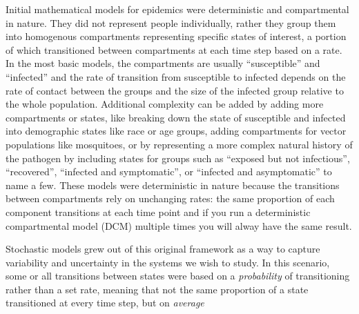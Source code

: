 \documentclass [11pt, proquest] {uwthesis}[2015/03/03]
\begin{document}
Initial mathematical models for epidemics were deterministic and
compartmental in nature. They did not represent people individually,
rather they group them into homogenous compartments representing
specific states of interest, a portion of which transitioned between
compartments at each time step based on a rate. In the most basic
models, the compartments are usually ``susceptible'' and ``infected''
and the rate of transition from susceptible to infected depends on the
rate of contact between the groups and the size of the infected group
relative to the whole population. Additional complexity can be added by
adding more compartments or states, like breaking down the state of
susceptible and infected into demographic states like race or age
groups, adding compartments for vector populations like mosquitoes, or
by representing a more complex natural history of the pathogen by
including states for groups such as ``exposed but not infectious'',
``recovered'', ``infected and symptomatic'', or ``infected and
asymptomatic'' to name a few. These models were deterministic in nature
because the transitions between compartments rely on unchanging rates:
the same proportion of each component transitions at each time point and
if you run a deterministic compartmental model (DCM) multiple times you
will alway have the same result.

Stochastic models grew out of this original framework as a way to
capture variability and uncertainty in the systems we wish to study. In
this scenario, some or all transitions between states were based on a
\emph{probability} of transitioning rather than a set rate, meaning that
not the same proportion of a state transitioned at every time step, but
on \emph{average}
\end{document}
